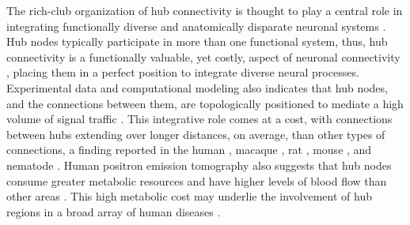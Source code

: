 \documentclass[10pt,letterpaper]{article}
\begin{document}
The rich-club organization of hub connectivity is thought to play a central role in integrating functionally diverse and anatomically disparate neuronal systems \cite{Fornito2015, VandenHeuvel2013a, ZamoraLopez:2010hy, Crossley2014, Crossley:2013kl}.
Hub nodes typically participate in more than one functional system, thus, hub connectivity is a functionally valuable, yet costly, aspect of neuronal connectivity \cite{deReus:2013cy, deReus:2014cz, ZamoraLopez:2010hy}, placing them in a perfect position to integrate diverse neural processes.
Experimental data and computational modeling also indicates that hub nodes, and the connections between them, are topologically positioned to mediate a high volume of signal traffic \cite{vandenHeuvel:2012kh, Harriger2012, Misic:2014it, Misic:2015jw}.
This integrative role comes at a cost, with connections between hubs extending over longer distances, on average, than other types of connections, a finding reported in the human \cite{vandenHeuvel:2012kh}, macaque \cite{Harriger2012}, rat \cite{VandenHeuvel2016b}, mouse \cite{Fulcher:2016ck}, and nematode \cite{Towlson2013}.
Human positron emission tomography also suggests that hub nodes consume greater metabolic resources and have higher levels of blood flow than other areas \cite{Tomasi:2013kl, Collin:2014kq, Liang2013a}.
This high metabolic cost may underlie the involvement of hub regions in a broad array of human diseases \cite{Fornito2015, Bullmore:2012vl, Crossley:2014eta}. %
\end{document}

